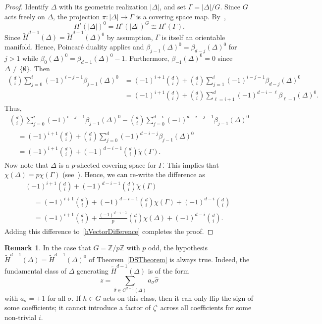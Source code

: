\documentclass[10pt]{amsart}
\theoremstyle{definition}
\newtheorem{rema}[theo]{Remark}
\newcommand{\ZZ}{{\mathbb Z}}
\begin{document}
\begin{proof}
Identify $\Delta$ with its geometric realization $|\Delta|$, and set $\Gamma= |\Delta|/G$. Since $G$ acts freely on $\Delta$, the projection $\pi:|\Delta|\to \Gamma$ is a covering space map. By~\cite[Proposition~3G.1]{Hatcher},
\[
H^i(|\Delta|)^0=H^i(|\Delta|)^G\cong H^i(\Gamma).
\]
Since $\widetilde{H}^{d-1}(\Delta)=\widetilde{H}^{d-1}(\Delta)^0$ by assumption, $\Gamma$ is itself an orientable manifold. Hence, Poincar\'e duality applies and $\beta_{j-1}(\Delta)^0=\beta_{d-j}(\Delta)^0$ for $j>1$ while $\beta_0(\Delta)^0=\beta_{d-1}(\Delta)^0-1$. Furthermore, $\beta_{-1}(\Delta)^0=0$ since $\Delta\not=\{\emptyset\}$. Then
\begin{align*}
\binom{d}{i}\sum_{j=0}^i(-1)^{i-j-1}\beta_{j-1}(\Delta)^0&=(-1)^{i+1}\binom{d}{i}+\binom{d}{i}\sum_{j=1}^i(-1)^{i-j-1}\beta_{d-j}(\Delta)^0\\
&=(-1)^{i+1}\binom{d}{i}+\binom{d}{i}\sum_{\ell=i+1}^{d}(-1)^{d-i-\ell}\beta_{\ell -1}(\Delta)^0.
\end{align*}
Thus,
\begin{multline*}
\binom{d}{i}\sum_{j=0}^i(-1)^{i-j-1}\beta_{j-1}(\Delta)^0-\binom{d}{i}\sum_{j=0}^{d-i}(-1)^{d-i-j-1}\beta_{j-1}(\Delta)^0\\
\begin{aligned}
&=(-1)^{i+1}\binom{d}{i}+\binom{d}{i}\sum_{j=0}^d(-1)^{d-i-j}\beta_{j-1}(\Delta)^0\\
&=(-1)^{i+1}\binom{d}{i}+(-1)^{d-i-1}\binom{d}{i}\tilde{\chi}(\Gamma).
\end{aligned}
\end{multline*}
Now note that $\Delta$ is a $p$-sheeted covering space for $\Gamma$. This implies that $\chi(\Delta)=p\chi(\Gamma)$ (see~\cite[Section~2.2]{Hatcher}). Hence, we can re-write the difference as
\begin{multline*}
(-1)^{i+1}\binom{d}{i}+(-1)^{d-i-1}\binom{d}{i}\tilde{\chi}(\Gamma)\\
\begin{aligned}
&=(-1)^{i+1}\binom{d}{i}+(-1)^{d-i-1}\binom{d}{i}\chi(\Gamma)+(-1)^{d-i}\binom{d}{i}\\
&=(-1)^{i+1}\binom{d}{i}+\frac{(-1)^{d-i-1}}{p}\binom{d}{i}\chi(\Delta)+(-1)^{d-i}\binom{d}{i}.
\end{aligned}
\end{multline*}
Adding this difference to~\eqref{hVectorDifference} completes the proof.
\end{proof}

\begin{rema}
In the case that $G=\ZZ/p\ZZ$ with $p$ odd, the hypothesis $\widetilde{H}^{d-1}(\Delta)=\widetilde{H}^{d-1}(\Delta)^0$ of Theorem~\ref{DSTheorem} is always true. Indeed, the fundamental class of $\Delta$ generating $\widetilde{H}^{d-1}(\Delta)$ is of the form
\[
z = \sum_{\widehat{\sigma}\in C^{d-1}(\Delta)}a_\sigma \widehat{\sigma}
\]
with $a_\sigma=\pm 1$ for all $\sigma$. If $h\in G$ acts on this class, then it can only flip the sign of some coefficients; it cannot introduce a factor of $\zeta^i$ across all coefficients for some non-trivial $i$.
\end{rema}
\end{document}
